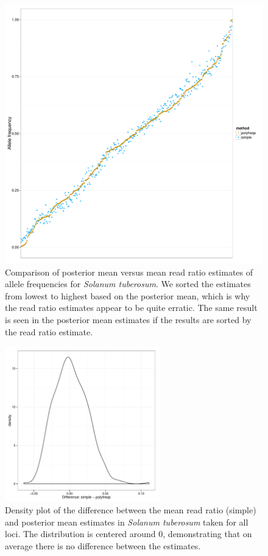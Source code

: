 \documentclass[]{article}
\begin{document}
\begin{figure}[b]
\centering
\caption{Comparison of posterior mean versus mean read ratio estimates of allele frequencies for \textit{Solanum tuberosum}. We sorted the estimates from lowest to highest based on the posterior mean, which is why the read ratio estimates appear to be quite erratic. The same result is seen in the posterior mean estimates if the results are sorted by the read ratio estimate.}
\includegraphics[width=\textwidth]{pdf/figS2}
\end{figure}



\begin{figure}[b]
\centering
\caption{Density plot of the difference between the mean read ratio (simple) and posterior mean estimates in \textit{Solanum tuberosum} taken for all loci. The distribution is centered around 0, demonstrating that on average there is no difference between the estimates.}
\includegraphics[width=0.6\textwidth]{pdf/figS3}
\end{figure}
\end{document}
